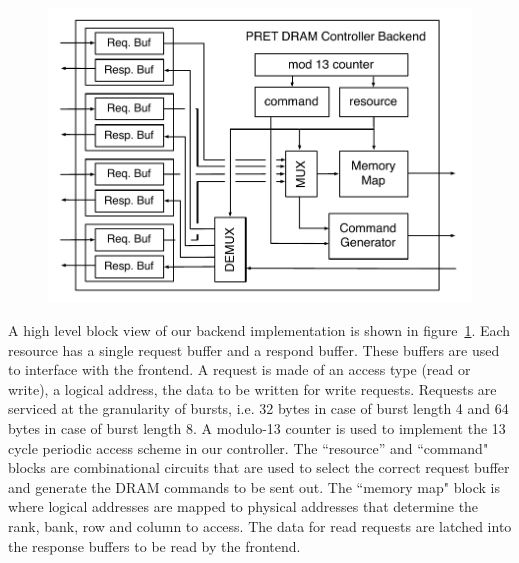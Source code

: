 \begin{figure}
\begin{center}
\includegraphics[width=1.1\linewidth]{figs/dram-backend-implementation}
\end{center}
\label{fig:dram-backend-implementation}
\end{figure}

A high level block view of our backend implementation is shown in figure~\ref{fig:dram-backend-implementation}.
Each resource has a single request buffer and a respond buffer.
These buffers are used to interface with the frontend.   
A request is made of an access type (read or write), a logical address, the data to be written for write requests. 
Requests are serviced at the granularity of bursts, i.e. 32 bytes in case of burst length 4 and 64 bytes in case of burst length 8.
A modulo-13 counter is used to implement the 13 cycle periodic access scheme in our controller.   
The ``resource'' and ``command" blocks are combinational circuits that are used to select the correct request buffer and generate the DRAM commands to be sent out. 
The ``memory map" block is where logical addresses are mapped to physical addresses that determine the rank, bank, row and column to access.
The data for read requests are latched into the response buffers to be read by the frontend.  

